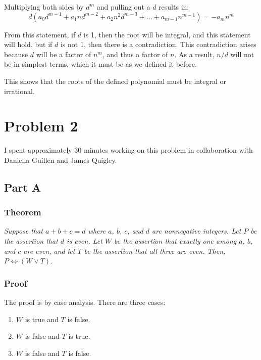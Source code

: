 \documentclass{article}
\begin{document}
Multiplying both sides by $d^{m}$ and pulling out a $d$ results in:
$$ d \left( a_{0}d^{m-1} + a_{1}nd^{m-2} + a_{2}n^{2}d^{m-3} + \ldots +
a_{m-1}n^{m-1} \right) = -a_{m}n^{m}$$

From this statement, if $d$ is 1, then the root will be integral, and this
statement will hold, but if $d$ is not 1, then there is a contradiction. This
contradiction arises because $d$ will be a factor of $n^{m}$, and thus a factor
of $n$. As a result, $n/d$ will not be in simplest terms, which it must be as we
defined it before.

\bigbreak

This shows that the roots of the defined polynomial must be integral or
irrational.

\section*{Problem 2}

I spent approximately 30 minutes working on this problem in collaboration with
Daniella Guillen and James Quigley.

\subsection*{Part A}

\subsubsection*{Theorem}

\textit{Suppose that $a + b + c = d$ where $a$, $b$, $c$, and $d$ are nonnegative
integers. Let $P$ be the assertion that $d$ is even. Let $W$ be the assertion
that exactly one among $a$, $b$, and $c$ are even, and let $T$ be the assertion
that all three are even. Then, $ P \iff (W \lor T) $.}

\subsubsection*{Proof}

The proof is by case analysis. There are three cases:

\begin{enumerate}[\hspace{1cm}1.]
  \item $W$ is true and $T$ is false.
  \item $W$ is false and $T$ is true.
  \item $W$ is false and $T$ is false.
\end{enumerate}
\end{document}
